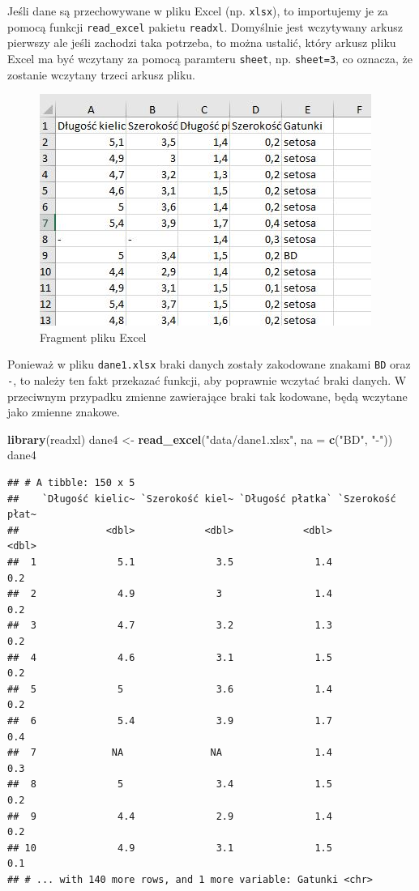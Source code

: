\documentclass[]{book}
\newenvironment{Shaded}{\begin{snugshade}}{\end{snugshade}}
\newcommand{\DataTypeTok}[1]{\textcolor[rgb]{0.13,0.29,0.53}{#1}}
\newcommand{\KeywordTok}[1]{\textcolor[rgb]{0.13,0.29,0.53}{\textbf{#1}}}
\newcommand{\NormalTok}[1]{#1}
\newcommand{\StringTok}[1]{\textcolor[rgb]{0.31,0.60,0.02}{#1}}
\theoremstyle{plain}
\theoremstyle{definition}
\begin{document}
Jeśli dane są przechowywane w pliku Excel (np. \texttt{xlsx}), to importujemy je za pomocą funkcji \texttt{read\_excel} pakietu \texttt{readxl}. Domyślnie jest wczytywany arkusz pierwszy ale jeśli zachodzi taka potrzeba, to można ustalić, który arkusz pliku Excel ma być wczytany za pomocą paramteru \texttt{sheet}, np. \texttt{sheet=3}, co oznacza, że zostanie wczytany trzeci arkusz pliku.

\begin{figure}
\centering
\includegraphics{images/excel.jpg}
\caption{\label{fig:excel}Fragment pliku Excel}
\end{figure}

Ponieważ w pliku \texttt{dane1.xlsx} braki danych zostały zakodowane znakami \texttt{BD} oraz \texttt{-}, to należy ten fakt przekazać funkcji, aby poprawnie wczytać braki danych. W przeciwnym przypadku zmienne zawierające braki tak kodowane, będą wczytane jako zmienne znakowe.

\begin{Shaded}
\begin{Highlighting}[]
\KeywordTok{library}\NormalTok{(readxl)}
\NormalTok{dane4 <-}\StringTok{ }\KeywordTok{read_excel}\NormalTok{(}\StringTok{"data/dane1.xlsx"}\NormalTok{, }\DataTypeTok{na =} \KeywordTok{c}\NormalTok{(}\StringTok{"BD"}\NormalTok{, }\StringTok{"-"}\NormalTok{))}
\NormalTok{dane4}
\end{Highlighting}
\end{Shaded}

\begin{verbatim}
## # A tibble: 150 x 5
##    `Długość kielic~ `Szerokość kiel~ `Długość płatka` `Szerokość płat~
##               <dbl>            <dbl>            <dbl>            <dbl>
##  1              5.1              3.5              1.4              0.2
##  2              4.9              3                1.4              0.2
##  3              4.7              3.2              1.3              0.2
##  4              4.6              3.1              1.5              0.2
##  5              5                3.6              1.4              0.2
##  6              5.4              3.9              1.7              0.4
##  7             NA               NA                1.4              0.3
##  8              5                3.4              1.5              0.2
##  9              4.4              2.9              1.4              0.2
## 10              4.9              3.1              1.5              0.1
## # ... with 140 more rows, and 1 more variable: Gatunki <chr>
\end{verbatim}
\end{document}
